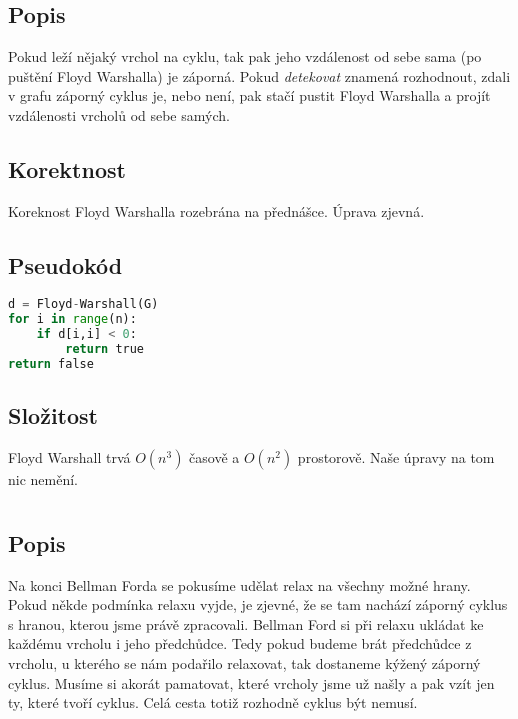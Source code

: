 \documentclass[a4paper]{article}
\begin{document}
\text{}\vspace{-0.1cm}
{\fontsize{12}{15}\selectfont \hspace{-0.5cm}}

\section{}
\subsection{Popis}
Pokud leží nějaký vrchol na cyklu, tak pak jeho vzdálenost od sebe sama (po puštění Floyd Warshalla) je záporná. Pokud \textit{detekovat} znamená rozhodnout, zdali v grafu záporný cyklus je, nebo není, pak stačí pustit Floyd Warshalla a projít vzdálenosti vrcholů od sebe samých.
\subsection{Korektnost}
Koreknost Floyd Warshalla rozebrána na přednášce. Úprava zjevná.
\subsection{Pseudokód}
\begin{lstlisting}[language=Python]
d = Floyd-Warshall(G)
for i in range(n):
	if d[i,i] < 0:
		return true
return false
\end{lstlisting}
\subsection{Složitost}
Floyd Warshall trvá $O(n^3)$ časově a $O(n^2)$ prostorově. Naše úpravy na tom nic nemění.

\section{}
\subsection{Popis}
Na konci Bellman Forda se pokusíme udělat relax na všechny možné hrany. Pokud někde podmínka relaxu vyjde, je zjevné, že se tam nachází záporný cyklus s hranou, kterou jsme právě zpracovali. Bellman Ford si při relaxu ukládat ke každému vrcholu i jeho předchůdce. Tedy pokud budeme brát předchůdce z vrcholu, u kterého se nám podařilo relaxovat, tak dostaneme kýžený záporný cyklus. Musíme si akorát pamatovat, které vrcholy jsme už našly a pak vzít jen ty, které tvoří cyklus. Celá cesta totiž rozhodně cyklus být nemusí.
\end{document}
